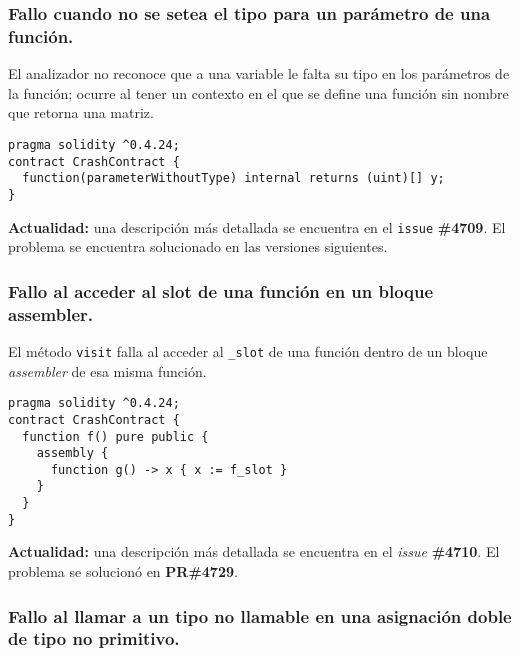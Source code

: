 \subsubsection{Fallo cuando no se setea el tipo para un parámetro de una función.}

El analizador no reconoce que a una variable le falta su tipo en los parámetros de la función; ocurre al tener un contexto en el que se define una función sin nombre que retorna una matriz.\\

\begin{lstlisting}[language=Solidity, caption={Código de ejemplo para parámetro de función sin tipo}]
pragma solidity ^0.4.24;
contract CrashContract {
  function(parameterWithoutType) internal returns (uint)[] y;
}
\end{lstlisting}

\textbf{Actualidad:} una descripción más detallada se encuentra en el \texttt{issue} \textbf{\#4709}\cite{GHI4709}. El problema se encuentra solucionado en las versiones siguientes. \\

\subsubsection{Fallo al acceder al slot de una función en un bloque assembler.}

El método \texttt{visit} falla al acceder al \texttt{\_slot} de una función dentro de un bloque \textit{assembler} de esa misma función.\\

\begin{lstlisting}[language=Solidity, caption={Código de ejemplo de fallo accediento a \texttt{\_slot}}]
pragma solidity ^0.4.24;
contract CrashContract {
  function f() pure public {
    assembly {
      function g() -> x { x := f_slot }
    }
  }
}
\end{lstlisting}

\textbf{Actualidad:} una descripción más detallada se encuentra en el \textit{issue} \textbf{\#4710}\cite{GHI4710}. El problema se solucionó en \textbf{PR\#4729}\cite{GHPR4729}.\\

\subsubsection{Fallo al llamar a un tipo no llamable en una asignación doble de tipo no primitivo.}

